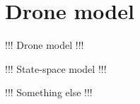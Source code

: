 \section{Drone model}\label{sec:drone_model}

!!! Drone model !!!

!!! State-space model !!!

!!! Something else !!!